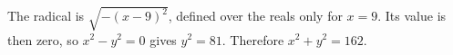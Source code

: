 The radical is $\sqrt{-(x-9)^2}$, defined over the reals only for $x=9$. Its value is then zero, so $x^2-y^2=0$ gives $y^2=81$. Therefore $x^2+y^2=\boxed{162}$.
